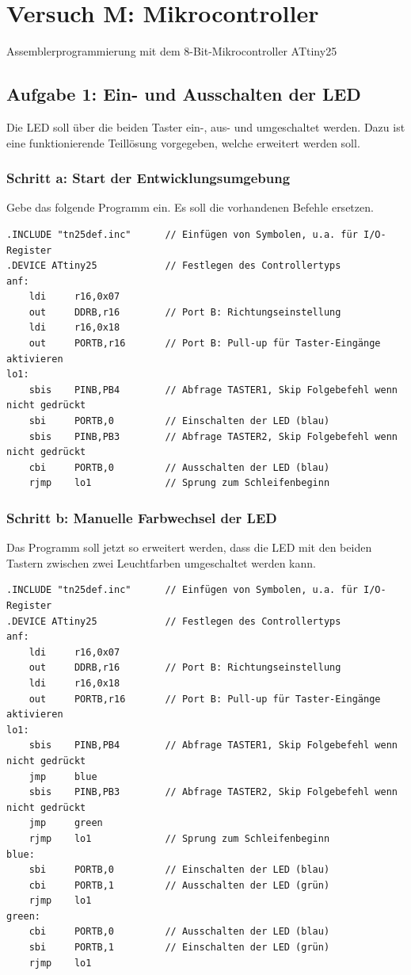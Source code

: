 \documentclass[a4paper,12pt,titlepage]{scrartcl}
\begin{document}
\newpage
\section*{Versuch M: Mikrocontroller}
Assemblerprogrammierung mit dem 8-Bit-Mikrocontroller ATtiny25

\subsection*{Aufgabe 1: Ein- und Ausschalten der LED}
Die LED soll über die beiden Taster ein-, aus- und umgeschaltet werden. Dazu ist eine funktionierende Teillösung vorgegeben, welche erweitert werden soll.

\subsubsection*{Schritt a: Start der Entwicklungsumgebung}
Gebe das folgende Programm ein. Es soll die vorhandenen Befehle ersetzen.
\begin{lstlisting}[basicstyle=\tiny]
.INCLUDE "tn25def.inc"      // Einfügen von Symbolen, u.a. für I/O-Register
.DEVICE ATtiny25            // Festlegen des Controllertyps
anf:
    ldi     r16,0x07
    out     DDRB,r16        // Port B: Richtungseinstellung
    ldi     r16,0x18
    out     PORTB,r16       // Port B: Pull-up für Taster-Eingänge aktivieren
lo1:
    sbis    PINB,PB4        // Abfrage TASTER1, Skip Folgebefehl wenn nicht gedrückt
    sbi     PORTB,0         // Einschalten der LED (blau)
    sbis    PINB,PB3        // Abfrage TASTER2, Skip Folgebefehl wenn nicht gedrückt
    cbi     PORTB,0         // Ausschalten der LED (blau)
    rjmp    lo1             // Sprung zum Schleifenbeginn
\end{lstlisting}

\subsubsection*{Schritt b: Manuelle Farbwechsel der LED}
Das Programm soll jetzt so erweitert werden, dass die LED mit den beiden Tastern zwischen zwei Leuchtfarben umgeschaltet werden kann.
\begin{lstlisting}[basicstyle=\tiny]
.INCLUDE "tn25def.inc"      // Einfügen von Symbolen, u.a. für I/O-Register
.DEVICE ATtiny25            // Festlegen des Controllertyps
anf:
    ldi     r16,0x07
    out     DDRB,r16        // Port B: Richtungseinstellung
    ldi     r16,0x18
    out     PORTB,r16       // Port B: Pull-up für Taster-Eingänge aktivieren
lo1:
    sbis    PINB,PB4        // Abfrage TASTER1, Skip Folgebefehl wenn nicht gedrückt
    jmp     blue
    sbis    PINB,PB3        // Abfrage TASTER2, Skip Folgebefehl wenn nicht gedrückt
    jmp     green
    rjmp    lo1             // Sprung zum Schleifenbeginn
blue:
    sbi     PORTB,0         // Einschalten der LED (blau)
    cbi     PORTB,1         // Ausschalten der LED (grün)
    rjmp    lo1
green:
    cbi     PORTB,0         // Ausschalten der LED (blau)
    sbi     PORTB,1         // Einschalten der LED (grün)
    rjmp    lo1
\end{lstlisting}
\end{document}

